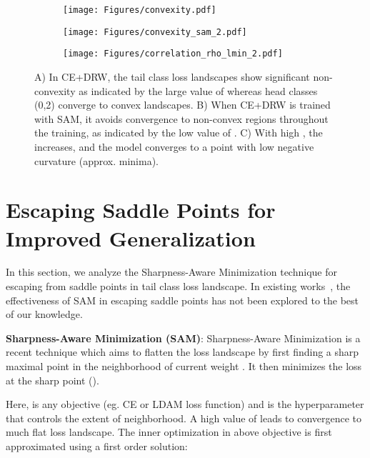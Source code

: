 \documentclass{article}
\begin{document}
\begin{figure}
\begin{subfigure}{.33\textwidth}
  \centering
  \texttt{[image: Figures/convexity.pdf]}
\end{subfigure}
\begin{subfigure}{.33\textwidth}
  \centering
  \texttt{[image: Figures/convexity\_sam\_2.pdf]}  
  \label{fig:app_dynamics}
\end{subfigure}
\begin{subfigure}{.33\textwidth}
  \centering
  \texttt{[image: Figures/correlation\_rho\_lmin\_2.pdf]}  
  \label{fig:rhovslam}
\end{subfigure}
\vspace{-1em}
\caption{A) In CE+DRW, the tail class loss landscapes show significant non-convexity as indicated by the large value of  whereas head classes (0,2) converge to convex landscapes.
B) When CE+DRW is trained with SAM, it avoids convergence to non-convex regions throughout the training, as indicated by the low value of .
C) With high , the  increases, and the model converges to a point with low negative curvature (approx. minima).}
\label{fig:dynamics}
\end{figure}
\section{Escaping Saddle Points for Improved Generalization}
\label{sec:sam_analysis}
In this section, we analyze the Sharpness-Aware Minimization technique for escaping from saddle points in tail class loss landscape. In existing works~\cite{andriushchenko2022understanding, liu2022towards, zhuang2022surrogate}, the effectiveness of SAM in escaping saddle points has not been explored to the best of our knowledge.

\textbf{Sharpness-Aware Minimization (SAM)}: 
Sharpness-Aware Minimization is a recent technique which aims to flatten the loss landscape by first finding a sharp maximal point  in the neighborhood of current weight . It then minimizes the loss at the sharp point ().    

Here,  is any objective (eg. CE or LDAM loss function) and  is the hyperparameter that controls the extent of neighborhood. A high value of  leads to convergence to much flat loss landscape. The inner optimization in above objective is first approximated using a first order solution:\vspace{-1em}
\end{document}
